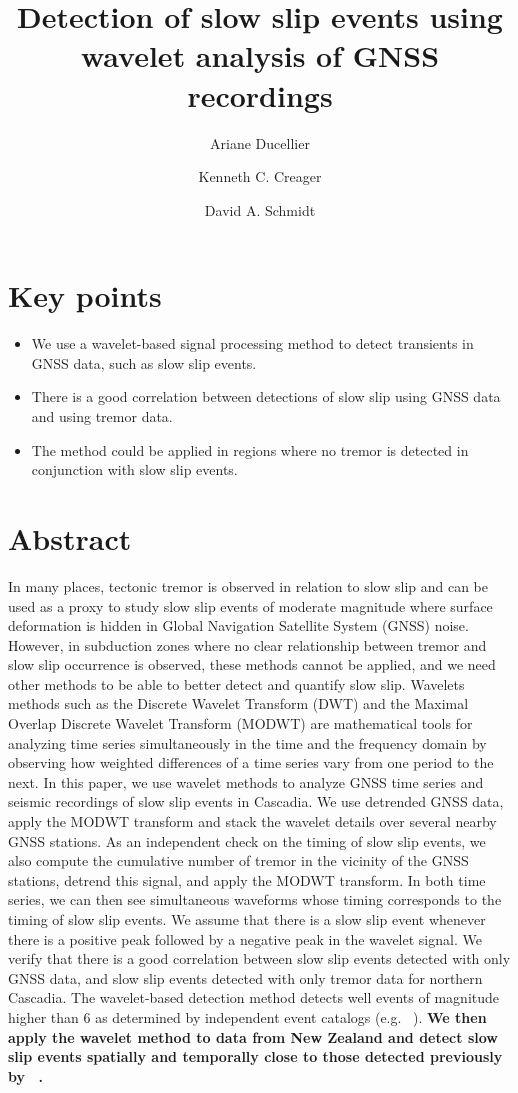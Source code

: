 \documentclass{article}
\title{Detection of slow slip events using wavelet analysis of GNSS recordings}
\author[1]{Ariane Ducellier}
\author[2]{Kenneth C. Creager}
\author[2]{David A. Schmidt}
\affil[1]{Corresponding author. University of Washington, Department of Earth and Space Sciences, Box 351310, 4000 15th Avenue NE Seattle, WA 98195-1310}
\affil[2]{University of Washington, Department of Earth and Space Sciences}
\date{}
\begin{document}
\maketitle

\section*{Key points}

\begin{itemize}
\item We use a wavelet-based signal processing method to detect transients in GNSS data, such as slow slip events.
\item There is a good correlation between detections of slow slip using GNSS data and using tremor data.
\item The method could be applied in regions where no tremor is detected in conjunction with slow slip events.
\end{itemize}

\newpage

\doublespacing

\section*{Abstract}

In many places, tectonic tremor is observed in relation to slow slip and can be used as a proxy to study slow slip events of moderate magnitude where surface deformation is hidden in Global Navigation Satellite System (GNSS) noise. However, in subduction zones where no clear relationship between tremor and slow slip occurrence is observed, these methods cannot be applied, and we need other methods to be able to better detect and quantify slow slip. Wavelets methods such as the Discrete Wavelet Transform (DWT) and the Maximal Overlap Discrete Wavelet Transform (MODWT) are mathematical tools for analyzing time series simultaneously in the time and the frequency domain by observing how weighted differences of a time series vary from one period to the next. In this paper, we use wavelet methods to analyze GNSS time series and seismic recordings of slow slip events in Cascadia. We use detrended GNSS data, apply the MODWT transform and stack the wavelet details over several nearby GNSS stations. As an independent check on the timing of slow slip events, we also compute the cumulative number of tremor in the vicinity of the GNSS stations, detrend this signal, and apply the MODWT transform. In both time series, we can then see simultaneous waveforms whose timing corresponds to the timing of slow slip events. We assume that there is a slow slip event whenever there is a positive peak followed by a negative peak in the wavelet signal. We verify that there is a good correlation between slow slip events detected with only GNSS data, and slow slip events detected with only tremor data for northern Cascadia. The wavelet-based detection method detects well events of magnitude higher than 6 as determined by independent event catalogs (e.g. ~\citep{MIC_2019}). \textbf{We then apply the wavelet method to data from New Zealand and detect slow slip events spatially and temporally close to those detected previously by ~\citet{TOD_2016}.}
\end{document}
